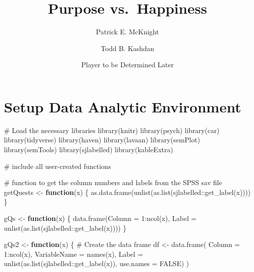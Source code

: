 \documentclass[
  letterpaper,
  DIV=11,
  numbers=noendperiod]{scrartcl}
\title{Purpose vs.~Happiness}
\author{Patrick E. McKnight \and Todd B. Kashdan \and Player to be
Determined Later}
\date{}
\newenvironment{Shaded}{\begin{snugshade}}{\end{snugshade}}
\newcommand{\AttributeTok}[1]{\textcolor[rgb]{0.40,0.45,0.13}{#1}}
\newcommand{\CommentTok}[1]{\textcolor[rgb]{0.37,0.37,0.37}{#1}}
\newcommand{\ConstantTok}[1]{\textcolor[rgb]{0.56,0.35,0.01}{#1}}
\newcommand{\ControlFlowTok}[1]{\textcolor[rgb]{0.00,0.23,0.31}{\textbf{#1}}}
\newcommand{\DecValTok}[1]{\textcolor[rgb]{0.68,0.00,0.00}{#1}}
\newcommand{\FunctionTok}[1]{\textcolor[rgb]{0.28,0.35,0.67}{#1}}
\newcommand{\NormalTok}[1]{\textcolor[rgb]{0.00,0.23,0.31}{#1}}
\newcommand{\OtherTok}[1]{\textcolor[rgb]{0.00,0.23,0.31}{#1}}
\newcommand{\SpecialCharTok}[1]{\textcolor[rgb]{0.37,0.37,0.37}{#1}}
\renewcommand*\contentsname{Table of contents}
\newcommand\contentsname{Table of contents}
\begin{document}
\maketitle

\renewcommand*\contentsname{Table of contents}
{
\hypersetup{linkcolor=}
\setcounter{tocdepth}{3}
\tableofcontents
}
\section{Setup Data Analytic
Environment}\label{setup-data-analytic-environment}

\begin{Shaded}
\begin{Highlighting}[]
\CommentTok{\# Load the necessary libraries}
\FunctionTok{library}\NormalTok{(knitr)}
\FunctionTok{library}\NormalTok{(psych)}
\FunctionTok{library}\NormalTok{(car)}
\FunctionTok{library}\NormalTok{(tidyverse)}
\FunctionTok{library}\NormalTok{(haven)}
\FunctionTok{library}\NormalTok{(lavaan)}
\FunctionTok{library}\NormalTok{(semPlot)}
\FunctionTok{library}\NormalTok{(semTools)}
\FunctionTok{library}\NormalTok{(sjlabelled)}
\FunctionTok{library}\NormalTok{(kableExtra)}


\CommentTok{\# include all user{-}created functions}

\CommentTok{\# function to get the column numbers and labels from the SPSS sav file}
\NormalTok{getQuests }\OtherTok{\textless{}{-}} \ControlFlowTok{function}\NormalTok{(x) \{}
  \FunctionTok{as.data.frame}\NormalTok{(}\FunctionTok{unlist}\NormalTok{(}\FunctionTok{as.list}\NormalTok{(sjlabelled}\SpecialCharTok{::}\FunctionTok{get\_label}\NormalTok{(x))))}
\NormalTok{\}}

\NormalTok{gQs }\OtherTok{\textless{}{-}} \ControlFlowTok{function}\NormalTok{(x) \{}
  \FunctionTok{data.frame}\NormalTok{(}\AttributeTok{Column =} \DecValTok{1}\SpecialCharTok{:}\FunctionTok{ncol}\NormalTok{(x),}
             \AttributeTok{Label =} \FunctionTok{unlist}\NormalTok{(}\FunctionTok{as.list}\NormalTok{(sjlabelled}\SpecialCharTok{::}\FunctionTok{get\_label}\NormalTok{(x))))}
\NormalTok{\}}

\NormalTok{gQs2 }\OtherTok{\textless{}{-}} \ControlFlowTok{function}\NormalTok{(x) \{}
  \CommentTok{\# Create the data frame}
\NormalTok{  df }\OtherTok{\textless{}{-}} \FunctionTok{data.frame}\NormalTok{(}
    \AttributeTok{Column =} \DecValTok{1}\SpecialCharTok{:}\FunctionTok{ncol}\NormalTok{(x),}
    \AttributeTok{VariableName =} \FunctionTok{names}\NormalTok{(x),}
    \AttributeTok{Label =} \FunctionTok{unlist}\NormalTok{(}\FunctionTok{as.list}\NormalTok{(sjlabelled}\SpecialCharTok{::}\FunctionTok{get\_label}\NormalTok{(x)), }\AttributeTok{use.names =} \ConstantTok{FALSE}\NormalTok{)}
\NormalTok{  )}
  

\end{Highlighting}
\end{Shaded}
\end{document}
